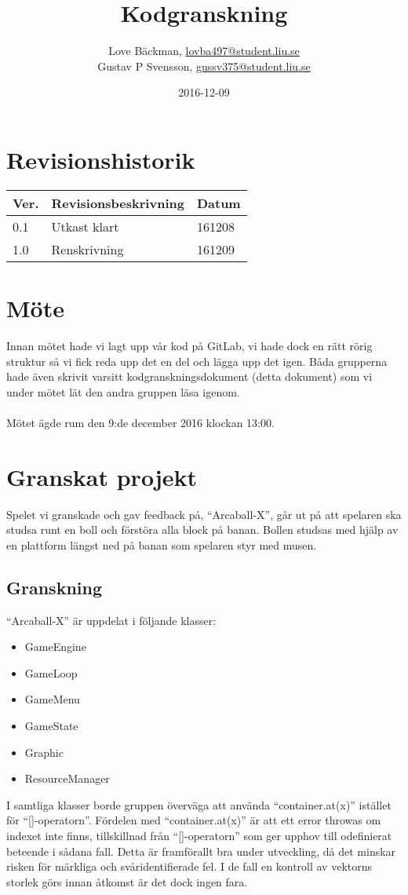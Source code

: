 \documentclass{TDP003mall}
\author{Love Bäckman, \url{lovba497@student.liu.se}\\
  Gustav P Svensson, \url{gussv375@student.liu.se}}
\title{Kodgranskning}
\date{2016-12-09}
\begin{document}
\projectpage
\section{Revisionshistorik}
\begin{table}[!h]
\begin{tabularx}{\linewidth}{|l|X|l|}
\hline
Ver. & Revisionsbeskrivning & Datum \\\hline
0.1 & Utkast klart & 161208 \\\hline
1.0 & Renskrivning & 161209 \\\hline
\end{tabularx}
\end{table}


\section{Möte}
Innan mötet hade vi lagt upp vår kod på GitLab, vi hade dock en rätt rörig struktur så vi fick reda upp det en del och lägga upp det igen. Båda grupperna hade även skrivit varsitt kodgranskningsdokument (detta dokument) som vi under mötet lät den andra gruppen läsa igenom.
\\\\
Mötet ägde rum den 9:de december 2016 klockan 13:00.

\section{Granskat projekt}
Spelet vi granskade och gav feedback på, ``Arcaball-X'',  går ut på att spelaren ska studsa runt en boll och förstöra alla block på banan. Bollen studsas med hjälp av en plattform längst ned på banan som spelaren styr med musen.

\subsection{Granskning}
``Arcaball-X'' är uppdelat i följande klasser:
\begin{itemize}
\item GameEngine
\item GameLoop
\item GameMenu
\item GameState
\item Graphic
\item ResourceManager
\end{itemize}

I samtliga klasser borde gruppen överväga att använda ``container.at(x)'' istället för ``[]-operatorn''. Fördelen med ``container.at(x)'' är att ett error throwas om indexet inte finns, tillskillnad från ``[]-operatorn'' som ger upphov till odefinierat beteende i sådana fall. Detta är framförallt bra under utveckling, då det minskar risken för märkliga och svåridentifierade fel. I de fall en kontroll av vektorns storlek görs innan åtkomst är det dock ingen fara.
\end{document}
